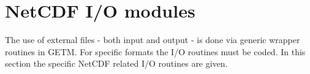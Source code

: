 
\section{NetCDF I/O modules}

The use of external files - both input and output - is done via 
generic wrapper routines in GETM. For specific formats the I/O 
routines must be coded. In this section the specific NetCDF related 
I/O routines are given.


